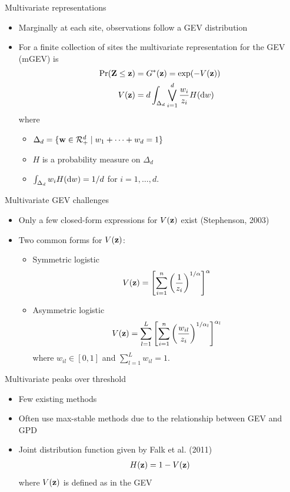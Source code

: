 \documentclass{beamer}
\begin{document}
\begin{frame}{Multivariate representations}
  \begin{itemize}
    \item Marginally at each site, observations follow a GEV distribution
    \item For a finite collection of sites the multivariate representation for the GEV (mGEV) is
    \begin{align*}
      \Pr(\mbox{\bf Z} \le \mbox{\bf z})  &= G^*(\mbox{\bf z}) = \exp(-V(\mbox{\bf z}))\\
            V(\mbox{\bf z})    &= d \int_{\Delta_d} \bigvee_{i = 1}^d \frac{w_i}{z_i} H(\text{d} w)
    \end{align*}
    where
    \begin{itemize}
      \item $\Delta_d = \{ \mbox{\bf w} \in {\cal R}^d_+ \mid w_1 + \cdots + w_d = 1\}$
      \item $H$ is a probability measure on $\Delta_d$
      \item $\int_{\Delta_d}w_i H(\text{d} w) = 1 / d$ for $i = 1, \ldots, d$.
    \end{itemize}
  \end{itemize}
\end{frame}

\begin{frame}{Multivariate GEV challenges}
  \begin{itemize}
    \item Only a few closed-form expressions for $V(\mbox{\bf z})$ exist (Stephenson, 2003)
    \item Two common forms for $V(\mbox{\bf z})$:
    \begin{itemize}
      \item Symmetric logistic
      \begin{align*}
        V(\mbox{\bf z}) = \left[\sum_{i = 1}^n \left( \frac{ 1 }{ z_i } \right)^{1/\alpha}\right]^\alpha
      \end{align*}
      \item Asymmetric logistic
      \begin{align*}
        V(\mbox{\bf z}) = \sum_{l = 1}^L \left[\sum_{i = 1}^n \left(\frac{w_{il}}{z_i} \right)^{1 / \alpha_l} \right]^{\alpha_l}
      \end{align*}
      where $w_{il} \in [0, 1]$ and $\sum_{l = 1}^L w_{il} = 1$.
    \end{itemize}
  \end{itemize}
\end{frame}

\begin{frame}{Multivariate peaks over threshold}
  \begin{itemize}
    \item Few existing methods
    \item Often use max-stable methods due to the relationship between GEV and GPD
    \item Joint distribution function given by Falk et al. (2011)
    \begin{align*}
      H(\mbox{\bf z}) = 1 - V(\mbox{\bf z})
    \end{align*}
    where $V(\mbox{\bf z})$ is defined as in the GEV
  \end{itemize}
\end{frame}
\end{document}

